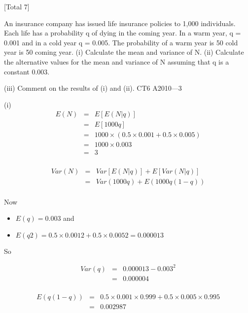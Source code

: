 \documentclass[a4paper,12pt]{article}
\begin{document}
 


[Total 7]

An insurance company has issued life insurance policies to 1,000 individuals. Each
life has a probability q of dying in the coming year. In a warm year, q = 0.001 and in
a cold year q = 0.005. The probability of a warm year is 50%
cold year is 50%
coming year.
(i) Calculate the mean and variance of N.
(ii) Calculate the alternative values for the mean and variance of N assuming that
q is a constant 0.003.

(iii) Comment on the results of (i) and (ii).
CT6 A2010—3


(i)
\begin{eqnarray*}
E ( N ) &=& E \left[ E ( N | q ) \right]\\
&=& E \left[ 1000 q \right]\\
&=& 1000 \times ( 0.5 \times 0.001 + 0.5 \times 0.005 )\\
&=& 1000 \times 0.003 \\
&=& 3\\
\end{eqnarray*}

\begin{eqnarray*}
Var ( N ) 
&=& Var \left[ E ( N |q ) \right] + E  \left[ Var ( N| q ) \right]\\
&=& Var (1000 q ) + E (1000 q (1 − q )) \\
\end{eqnarray*}

Now
\begin{itemize}
\item $E ( q ) = 0.003$ and 
\item $E ( q 2 ) = 0.5 \times 0.001 2 + 0.5 \times 0.005 2 = 0.000013$
\end{itemize}

So 

\begin{eqnarray*}
Var ( q ) &=& 0.000013 − 0.003^2 \\
&=& 0.000004\\
\end{eqnarray*}

\begin{eqnarray*}
E ( q (1 − q )) &=&  0.5 \times 0.001 \times 0.999 + 0.5 \times 0.005 \times 0.995 \\ &=&  0.002987  \\
\end{eqnarray*}
\end{document}
